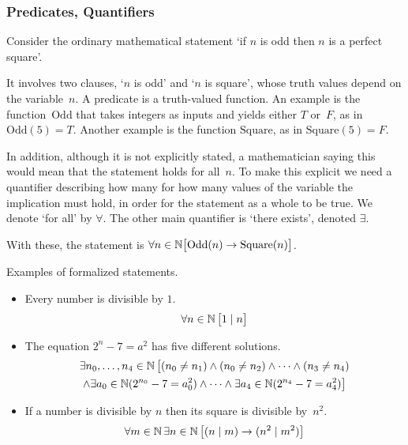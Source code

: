 \documentclass[10pt,t]{beamer}
\begin{document}
\begin{frame}
\frametitle{Predicates, Quantifiers}
Consider the ordinary mathematical
statement `if $n$ is odd then $n$ is a perfect square'.

\pause
It involves two clauses, `$n$ is odd' and `$n$ is square',
whose truth values depend on the variable~$n$.
A \alert{predicate} is a truth-valued function.
An example is the function~$\text{Odd}$ that takes integers as inputs and 
yields either $T$ or~$F$, as in~$\text{Odd}(5)=T$.
Another example is the function $\text{Square}$, as in $\text{Square}(5)=F$.

\pause
In addition, although it is not explicitly stated,
a mathematician saying this would mean that the statement holds for all~$n$.
To make this explicit we need a
\alert{quantifier} describing how many for how many values of the
variable the implication must hold, in order for the statement as a whole to
be true.
We denote `for all' by $\forall$.
The other main quantifier is 
`there exists', denoted $\exists$.

With these, the statement is 
$\forall n\in\mathbb{N} \big[\text{Odd}(n)\rightarrow\text{Square}(n)\big]$.
\end{frame}
\begin{frame}
Examples of formalized statements.

\begin{itemize}
\item Every number is divisible by $1$.
  \begin{equation*}
    \forall n\in\mathbb{N}\,\big[1\mid n\big]
  \end{equation*}

\item The equation $2^n-7=a^2$ has five different solutions.
  \begin{multline*}
    \exists n_0, \ldots, n_4\in\mathbb{N}\, \big[(n_0\neq n_1) 
                                     \wedge (n_0\neq n_2) 
                                     \wedge \cdots 
                                     \wedge (n_3\neq n_4)  \\
                                     \wedge \exists a_0\in\mathbb{N}(2^{n_0}-7=a_0^2)
                                     \wedge\cdots\wedge
                                     \exists a_4\in\mathbb{N}(2^{n_4}-7=a_4^2)\big]
  \end{multline*}

\item If a number is divisible by $n$ then its square is divisible by~$n^2$.
  \begin{equation*}
    \forall m\in\mathbb{N}\,\exists n\in\mathbb{N}\,
        \big[(n\mid m)\rightarrow (n^2\mid m^2)\big]
  \end{equation*}
\end{itemize}
\end{frame}
\end{document}
